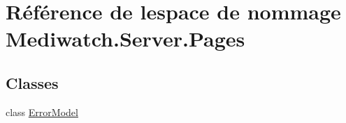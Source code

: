 \hypertarget{namespace_mediwatch_1_1_server_1_1_pages}{}\section{Référence de l\textquotesingle{}espace de nommage Mediwatch.\+Server.\+Pages}
\label{namespace_mediwatch_1_1_server_1_1_pages}
\subsection*{Classes}
\begin{DoxyCompactItemize}
\item 
class \hyperlink{class_mediwatch_1_1_server_1_1_pages_1_1_error_model}{Error\+Model}
\end{DoxyCompactItemize}
